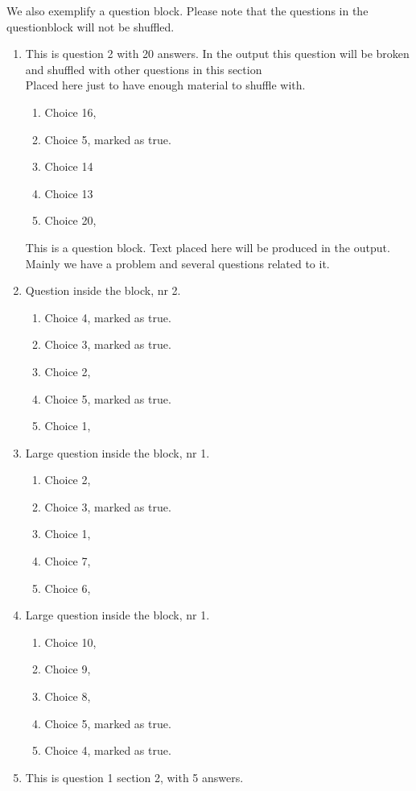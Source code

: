 \documentclass[a4paper,10pt]{article}%
\begin{document}
We also exemplify a question block. Please note that the questions in the questionblock will not be shuffled.
\begin{enumerate}[resume]
	
	
\item  This is question 2 with 20 answers. In the output this question will be broken and shuffled with other questions in this section\\
	Placed here just to have enough material to shuffle with.
	
\begin{enumerate}
\item  Choice 16,
		\item  Choice 5, marked as true. %
		\item  Choice 14
		\item  Choice 13
		\item  Choice 20, %
	\end{enumerate}
%
		This is a question block. Text placed here will be produced in the output. Mainly we have a problem and several questions related to it.
		
		
	

\item  Question inside the block, nr 2.
		
\begin{enumerate}
\item  Choice 4, marked as true. %
			\item  Choice 3, marked as true. %
			\item  Choice 2,
			\item  Choice 5, marked as true. %
		\item  Choice 1,
			\end{enumerate}
\item  Large question inside the block, nr 1.
		
\begin{enumerate}
\item  Choice 2,
			\item  Choice 3, marked as true. %
			\item  Choice 1,
			\item  Choice 7,
			\item  Choice 6,
			\end{enumerate}
\item  Large question inside the block, nr 1.
		
\begin{enumerate}
\item  Choice 10,
		\item  Choice 9,
			\item  Choice 8,
			\item  Choice 5, marked as true. %
			\item  Choice 4, marked as true. %
			\end{enumerate}
\item  This is question 1 section 2, with 5 answers.
	

\end{enumerate}
\end{document}
